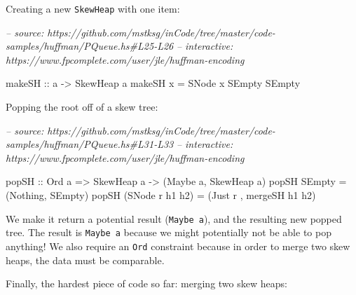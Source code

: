\documentclass[]{article}
\newenvironment{Shaded}{}{}
\newcommand{\CommentTok}[1]{\textcolor[rgb]{0.38,0.63,0.69}{\textit{#1}}}
\newcommand{\DataTypeTok}[1]{\textcolor[rgb]{0.56,0.13,0.00}{#1}}
\newcommand{\FunctionTok}[1]{\textcolor[rgb]{0.02,0.16,0.49}{#1}}
\newcommand{\NormalTok}[1]{#1}
\newcommand{\OtherTok}[1]{\textcolor[rgb]{0.00,0.44,0.13}{#1}}
\begin{document}
Creating a new \texttt{SkewHeap} with one item:

\begin{Shaded}
\begin{Highlighting}[]
\CommentTok{-- source: https://github.com/mstksg/inCode/tree/master/code-samples/huffman/PQueue.hs#L25-L26}
\CommentTok{-- interactive: https://www.fpcomplete.com/user/jle/huffman-encoding}

\OtherTok{makeSH ::}\NormalTok{ a }\OtherTok{->} \DataTypeTok{SkewHeap}\NormalTok{ a}
\NormalTok{makeSH x }\FunctionTok{=} \DataTypeTok{SNode}\NormalTok{ x }\DataTypeTok{SEmpty} \DataTypeTok{SEmpty}
\end{Highlighting}
\end{Shaded}

Popping the root off of a skew tree:

\begin{Shaded}
\begin{Highlighting}[]
\CommentTok{-- source: https://github.com/mstksg/inCode/tree/master/code-samples/huffman/PQueue.hs#L31-L33}
\CommentTok{-- interactive: https://www.fpcomplete.com/user/jle/huffman-encoding}

\OtherTok{popSH ::} \DataTypeTok{Ord}\NormalTok{ a }\OtherTok{=>} \DataTypeTok{SkewHeap}\NormalTok{ a }\OtherTok{->}\NormalTok{ (}\DataTypeTok{Maybe}\NormalTok{ a, }\DataTypeTok{SkewHeap}\NormalTok{ a)}
\NormalTok{popSH }\DataTypeTok{SEmpty}          \FunctionTok{=}\NormalTok{ (}\DataTypeTok{Nothing}\NormalTok{, }\DataTypeTok{SEmpty}\NormalTok{)}
\NormalTok{popSH (}\DataTypeTok{SNode}\NormalTok{ r h1 h2) }\FunctionTok{=}\NormalTok{ (}\DataTypeTok{Just}\NormalTok{ r , mergeSH h1 h2)}
\end{Highlighting}
\end{Shaded}

We make it return a potential result (\texttt{Maybe\ a}), and the resulting new
popped tree. The result is \texttt{Maybe\ a} because we might potentially not be
able to pop anything! We also require an \texttt{Ord} constraint because in
order to merge two skew heaps, the data must be comparable.

Finally, the hardest piece of code so far: merging two skew heaps:
\end{document}
